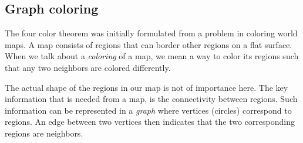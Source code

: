 \subsection{Graph coloring}

The four color theorem was initially formulated from a problem in coloring world maps. A map consists of regions that can border other regions on a flat surface. When we talk about a \textit{coloring} of a map, we mean a way to color its regions such that any two neighbors are colored differently.

The actual shape of the regions in our map is not of importance here. The key information that is needed from a map, is the connectivity between regions. Such information can be represented in a \textit{graph} where vertices (circles) correspond to regions. An edge between two vertices then indicates that the two corresponding regions are neighbors.

